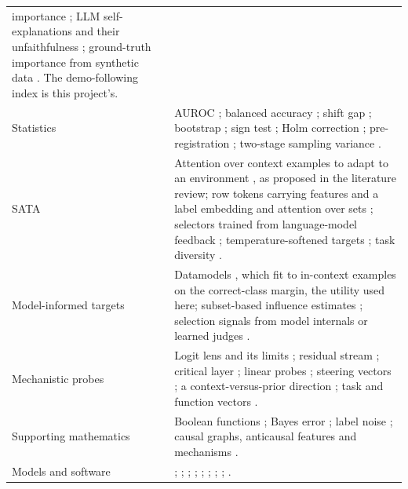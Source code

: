 \documentclass[11pt,a4paper]{article}
\newcommand{\1}{\mathbf{1}}
\theoremstyle{plain}
\theoremstyle{definition}
\theoremstyle{remark}
\begin{document}
{\begin{longtable}{L{3.0cm}L{13.0cm}}
importance \citep{breiman2001random,covert2021explaining}; LLM
self-explanations and
their unfaithfulness \citep{huang2023can,turpin2023language}; ground-truth
importance from synthetic data \citep{liu2021synthetic}. The demo-following
index is this project's. \\
Statistics &
AUROC \citep{hanley1982meaning,fawcett2006introduction}; balanced accuracy
\citep{brodersen2010balanced}; shift gap \citep{gardner2023tableshift};
bootstrap
\citep{efron1993introduction,davison1997bootstrap,saravanan2020application};
sign test \citep{dixon1946statistical}; Holm correction
\citep{holm1979simple}; pre-registration \citep{nosek2018preregistration};
two-stage sampling variance \citep{cochran1977sampling}. \\
SATA &
Attention over context examples to adapt to an environment
\citep{gupta2024context}, as proposed in the literature review; row tokens
carrying features and a label embedding \citep{hollmann2023tabpfn} and
attention over sets \citep{lee2019set}; selectors trained from language-model
feedback
\citep{rubin2022learning,li2023unified,ye2023compositional,zhang2022active};
temperature-softened targets \citep{hinton2015distilling}; task diversity
\citep{goddard2025when}. \\
Model-informed targets &
Datamodels \citep{ilyas2022datamodels}, which \citet{chang2023data} fit to
in-context examples on the correct-class margin, the utility used here;
subset-based influence estimates \citep{nguyen2023incontext}; selection
signals from model internals or learned judges
\citep{kato2025affinity,wang2026disp}. \\
Mechanistic probes &
Logit lens and its limits
\citep{nostalgebraist2020logit,belrose2023eliciting}; residual stream
\citep{elhage2021mathematical}; critical layer
\citep{halawi2024overthinking}; linear probes
\citep{alain2017understanding,belinkov2022probing}; steering vectors
\citep{turner2023activation,rimsky2024steering}; a context-versus-prior
direction \citep{minder2025controllable}; task and function vectors
\citep{hendel2023incontext,todd2024function}. \\
Supporting mathematics &
Boolean functions \citep{odonnell2014analysis}; Bayes error
\citep{devroye1996probabilistic}; label noise \citep{angluin1988learning};
causal graphs, anticausal features and mechanisms
\citep{pearl2009causality,scholkopf2012causal,peters2017elements}. \\
Models and software &
\citet{qwen2024qwen25}; \citet{grattafiori2024llama3};
\citet{paszke2019pytorch}; \citet{wolf2020transformers};
\citet{apple2024mps}; \citet{harris2020array};
\citet{pedregosa2011scikit}; \citet{chen2016xgboost};
\citet{reimers2019sentence}. \\
\end{longtable}
}
\end{document}
